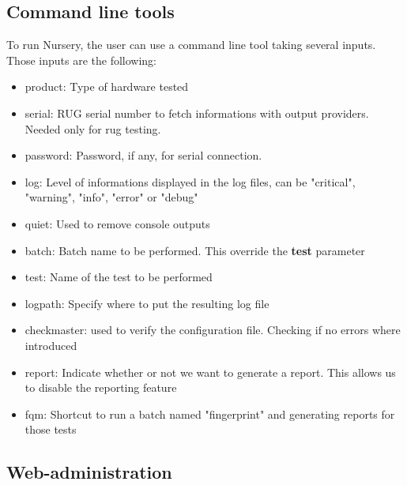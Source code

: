 \documentclass[12pt]{article}
\theoremstyle{definition}
\theoremstyle{definition}
\begin{document}
\subsection{Command line tools}

To run Nursery, the user can use a command line tool taking several inputs. Those inputs are the following:

\begin{itemize}
\item product: Type of hardware tested
\item serial: RUG serial number to fetch informations with output providers. Needed only for \gls{rug} testing.
\item password: Password, if any, for serial connection.
\item log: Level of informations displayed in the log files, can be "critical", "warning", "info", "error" or "debug"
\item quiet: Used to remove console outputs
\item batch: Batch name to be performed. This override the \textbf{test} parameter
\item test: Name of the test to be performed
\item logpath: Specify where to put the resulting log file
\item checkmaster: used to verify the configuration file. Checking if no errors where introduced
\item report: Indicate whether or not we want to generate a report. This allows us to disable the reporting feature
\item fqm: Shortcut to run a batch named "fingerprint" and generating reports for those tests
\end{itemize}

\subsection{Web-administration}
\end{document}
